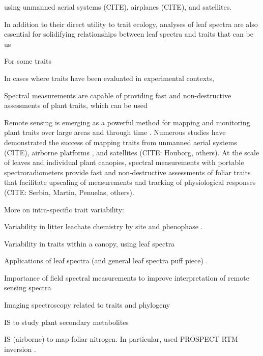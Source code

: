 
using unmanned aerial systems (CITE), airplanes (CITE), and satellites.

In addition to their direct utility to trait ecology, analyses of leaf spectra are also essential for solidifying relationships between leaf spectra and traits that can be us

For some traits

In cases where traits have been evaluated in experimental contexts, 

Spectral measurements are capable of providing fast and non-destructive assessments of plant traits, which can be used

Remote sensing is emerging as a powerful method for mapping and monitoring plant traits over large areas and through time \cite{schneider2017_mapping,schimel2013_observing,schimel2015_observing,jetz2016_diversity}.
Numerous studies have demonstrated the success of mapping traits from unmanned aerial systems (CITE), airborne platforms \cite{schneider2017_mapping,asner2017_scale,singh2015_istraits}, and satellites (CITE: Houborg, others).
At the scale of leaves and individual plant canopies, spectral measurements with portable spectroradiometers provide fast and non-destructive assessments of foliar traits that facilitate upscaling of measurements and tracking of physiological responses (CITE: Serbin, Martin, Penuelas, others).


More on intra-specific trait variability:

  Variability in litter leachate chemistry by site and phenophase \cite{hudson_2018_american}.

  Variability in traits within a canopy, using leaf spectra \cite{gara_2018_impact}

Applications of leaf spectra (and general leaf spectra puff piece) \cite{cavenderbares_2017_harnessing}.

    Importance of field spectral measurements to improve interpretation of remote sensing spectra

Imaging spectroscopy related to traits and phylogeny \cite{mcmanus_2016_phylogenetic}

IS to study plant secondary metabolites \cite{couture_2016_spectroscopic}

IS (airborne) to map foliar nitrogen. In particular, used PROSPECT RTM inversion \cite{wang_2018_mapping}.

